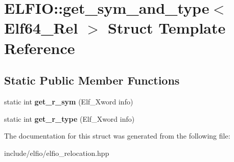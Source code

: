 \hypertarget{struct_e_l_f_i_o_1_1get__sym__and__type_3_01_elf64___rel_01_4}{}\section{E\+L\+F\+IO\+:\+:get\+\_\+sym\+\_\+and\+\_\+type$<$ Elf64\+\_\+\+Rel $>$ Struct Template Reference}
\label{struct_e_l_f_i_o_1_1get__sym__and__type_3_01_elf64___rel_01_4}
\subsection*{Static Public Member Functions}
\begin{DoxyCompactItemize}
\item 
static int {\bfseries get\+\_\+r\+\_\+sym} (Elf\+\_\+\+Xword info)\hypertarget{struct_e_l_f_i_o_1_1get__sym__and__type_3_01_elf64___rel_01_4_a9464509d4646131ad86a93c10c4eb186}{}\label{struct_e_l_f_i_o_1_1get__sym__and__type_3_01_elf64___rel_01_4_a9464509d4646131ad86a93c10c4eb186}

\item 
static int {\bfseries get\+\_\+r\+\_\+type} (Elf\+\_\+\+Xword info)\hypertarget{struct_e_l_f_i_o_1_1get__sym__and__type_3_01_elf64___rel_01_4_a0c3d9b4f371681e38ad5c9c5d5a5f25d}{}\label{struct_e_l_f_i_o_1_1get__sym__and__type_3_01_elf64___rel_01_4_a0c3d9b4f371681e38ad5c9c5d5a5f25d}

\end{DoxyCompactItemize}


The documentation for this struct was generated from the following file\+:\begin{DoxyCompactItemize}
\item 
include/elfio/elfio\+\_\+relocation.\+hpp\end{DoxyCompactItemize}
